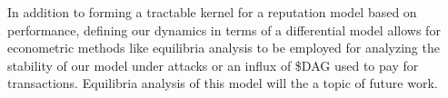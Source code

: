 \documentclass{article}
\begin{document}
In addition to forming a tractable kernel for a reputation model based on performance, defining our dynamics in terms of a differential model allows for econometric methods like equilibria analysis to be employed for analyzing the stability of our model under attacks or an influx of \$DAG used to pay for transactions. Equilibria analysis of this model will the a topic of future work.


\end{document}
